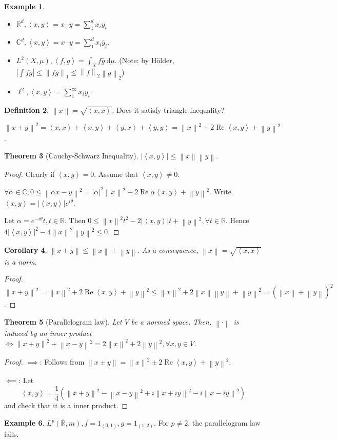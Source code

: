 \documentclass{report}
\newcommand{\R}{\mathbb{R}}
\newcommand{\C}{\mathbb{C}}
\def \re {\operatorname{Re}}
\newcommand{\df}{\ \mathrm{d}}
\newcommand{\inner}[2]{\left\langle #1, #2\right\rangle}
\newcommand{\norm}[1]{\left\| #1 \right\|}
\newtheorem{theorem}{Theorem}[chapter]
\newtheorem{corollary}[theorem]{Corollary}
\theoremstyle{definition}
\newtheorem{definition}[theorem]{Definition}
\newtheorem{example}[theorem]{Example}
\theoremstyle{remark}
\begin{document}
\begin{example}
	\begin{itemize}
		\item $\R^d, \inner{x}{y} = x \cdot y = \sum_{1}^d x_iy_i$
		\item $\C^d, \inner{x}{y} = x \cdot y = \sum_{1}^d x_i\bar y_i$.
		\item $L^2(X, \mu), \inner{f}{g} = \int_X f\bar{g}\df \mu$. (Note: by Hölder, $\left|\int f\bar{g}\right| \leq \norm{f\bar g}_1 \leq \norm{f}_2 \norm{g}_2$)
		\item $\ell^2, \inner{x}{y} = \sum_{1}^\infty x_iy_i$.
	\end{itemize}
\end{example}
\begin{definition}
	$\norm{x} = \sqrt{\inner{x}{x}}$. Does it satisfy triangle inequality?
\end{definition}
$\norm{x + y}^2 = \inner{x}{x} + \inner{x}{y} + \inner{y}{x} + \inner{y}{y} = \norm{x}^2 + 2\re\inner{x}{y} + \norm{y}^2$.

\begin{theorem}[Cauchy-Schwarz Inequality]
	$|\inner{x}{y}| \leq \norm{x}\norm{y}$.
\end{theorem}
\begin{proof}
	Clearly if $\inner{x}{y} = 0$. Assume that $\inner{x}{y} \neq 0$.

	$\forall \alpha \in \C, 0 \leq \norm{\alpha x - y}^2 = |\alpha|^2\norm{x}^2 - 2\re \alpha\inner{x}{y} + \norm{y}^2$. Write $\inner{x}{y} = |\inner{x}{y}|e^{i\theta}$.

	Let $\alpha = e^{-i\theta}t, t \in \R$. Then $0 \leq \norm{x}^2t^2 - 2|\inner{x}{y}|t + \norm{y}^2, \forall t \in \R$. Hence $4|\inner{x}{y}|^2 - 4\norm{x}^2\norm{y}^2 \leq 0$.
\end{proof}
\begin{corollary}
	$\norm{x + y} \leq \norm{x} + \norm{y}$. As a consequence, $\norm{x} = \sqrt{\inner{x}{x}}$ is a norm.
\end{corollary}
\begin{proof}
	$\norm{x + y}^2 = \norm{x}^2 + 2\re\inner{x}{y} + \norm{y}^2 \leq \norm{x}^2 + 2\norm{x}\norm{y} + \norm{y}^2 = (\norm{x} + \norm{y})^2$.
\end{proof}

\begin{theorem}
	[Parallelogram law]
	Let $V$ be a normed space. Then, $\norm{\cdot}$ is induced by an inner product $\iff \norm{x + y}^2 + \norm{x - y}^2 = 2\norm{x}^2 + 2\norm{y}^2, \forall x, y \in V$.
\end{theorem}
\begin{proof}
	$\implies$: Follows from $\norm{x \pm y} = \norm{x}^2 \pm 2\re\inner{x}{y} + \norm{y}^2$.

	$\impliedby$: Let \[\inner{x}{y} = \frac{1}{4}\left(\norm{x + y}^2 - \norm{x - y}^2 +i\norm{x + iy}^2 - i\norm{x - iy}^2\right)\]
	and check that it is a inner product.
\end{proof}
\begin{example}
	$L^p(\R, m), f = 1_{(0, 1)}, g = 1_{(1, 2)}$. For $p \neq 2$, the parallelogram law fails.
\end{example}
\end{document}
